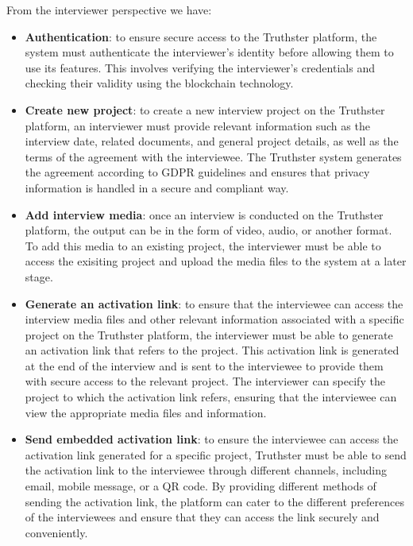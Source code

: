 \documentclass[target=mst,aauheader=]{thud}
\begin{document}
From the interviewer perspective we have:
\begin{itemize}
    \item \textbf{Authentication}: to ensure secure access to the Truthster platform, the system must authenticate the interviewer's identity before allowing them to use its features. This involves verifying the interviewer's credentials and checking their validity using the blockchain technology. 
    \item \textbf{Create new project}: to create a new interview project on the Truthster platform, an interviewer must provide relevant information such as the interview date, related documents, and general project details, as well as the terms of the agreement with the interviewee. The Truthster system generates the agreement according to GDPR guidelines and ensures that privacy information is handled in a secure and compliant way.
    \item \textbf{Add interview media}: once an interview is conducted on the Truthster platform, the output can be in the form of video, audio, or another format. To add this media to an existing project, the interviewer must be able to access the exisiting project and upload the media files to the system at a later stage.
    \item \textbf{Generate an activation link}: to ensure that the interviewee can access the interview media files and other relevant information associated with a specific project on the Truthster platform, the interviewer must be able to generate an activation link that refers to the project. This activation link is generated at the end of the interview and is sent to the interviewee to provide them with secure access to the relevant project. The interviewer can specify the project to which the activation link refers, ensuring that the interviewee can view the appropriate media files and information.
    \item \textbf{Send embedded activation link}: to ensure the interviewee can access the activation link generated for a specific project, Truthster must be able to send the activation link to the interviewee through different channels, including email, mobile message, or a QR code. By providing different methods of sending the activation link, the platform can cater to the different preferences of the interviewees and ensure that they can access the link securely and conveniently.
\end{itemize}
\end{document}
